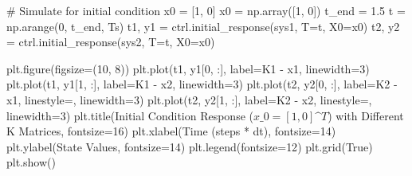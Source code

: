 \documentclass[
  letterpaper,
  DIV=11,
  numbers=noendperiod,
  oneside]{scrartcl}
\newenvironment{Shaded}{\begin{snugshade}}{\end{snugshade}}
\newcommand{\CommentTok}[1]{\textcolor[rgb]{0.37,0.37,0.37}{#1}}
\newcommand{\DecValTok}[1]{\textcolor[rgb]{0.68,0.00,0.00}{#1}}
\newcommand{\FloatTok}[1]{\textcolor[rgb]{0.68,0.00,0.00}{#1}}
\newcommand{\NormalTok}[1]{\textcolor[rgb]{0.00,0.23,0.31}{#1}}
\newcommand{\OperatorTok}[1]{\textcolor[rgb]{0.37,0.37,0.37}{#1}}
\newcommand{\StringTok}[1]{\textcolor[rgb]{0.13,0.47,0.30}{#1}}
\newcommand{\VariableTok}[1]{\textcolor[rgb]{0.07,0.07,0.07}{#1}}
\begin{document}
\begin{Shaded}
\begin{Highlighting}[numbers=left,,]
\CommentTok{\# Simulate for initial condition x0 = [1, 0]}
\NormalTok{x0 }\OperatorTok{=}\NormalTok{ np.array([}\DecValTok{1}\NormalTok{, }\DecValTok{0}\NormalTok{])}
\NormalTok{t\_end }\OperatorTok{=} \FloatTok{1.5} 
\NormalTok{t }\OperatorTok{=}\NormalTok{ np.arange(}\DecValTok{0}\NormalTok{, t\_end, Ts) }
\NormalTok{t1, y1 }\OperatorTok{=}\NormalTok{ ctrl.initial\_response(sys1, T}\OperatorTok{=}\NormalTok{t, X0}\OperatorTok{=}\NormalTok{x0)}
\NormalTok{t2, y2 }\OperatorTok{=}\NormalTok{ ctrl.initial\_response(sys2, T}\OperatorTok{=}\NormalTok{t, X0}\OperatorTok{=}\NormalTok{x0)}

\NormalTok{plt.figure(figsize}\OperatorTok{=}\NormalTok{(}\DecValTok{10}\NormalTok{, }\DecValTok{8}\NormalTok{))}
\NormalTok{plt.plot(t1, y1[}\DecValTok{0}\NormalTok{, :], label}\OperatorTok{=}\StringTok{\textquotesingle{}K1 {-} x1\textquotesingle{}}\NormalTok{, linewidth}\OperatorTok{=}\DecValTok{3}\NormalTok{)}
\NormalTok{plt.plot(t1, y1[}\DecValTok{1}\NormalTok{, :], label}\OperatorTok{=}\StringTok{\textquotesingle{}K1 {-} x2\textquotesingle{}}\NormalTok{, linewidth}\OperatorTok{=}\DecValTok{3}\NormalTok{)}
\NormalTok{plt.plot(t2, y2[}\DecValTok{0}\NormalTok{, :], label}\OperatorTok{=}\StringTok{\textquotesingle{}K2 {-} x1\textquotesingle{}}\NormalTok{, linestyle}\OperatorTok{=}\StringTok{\textquotesingle{}{-}{-}\textquotesingle{}}\NormalTok{, linewidth}\OperatorTok{=}\DecValTok{3}\NormalTok{) }
\NormalTok{plt.plot(t2, y2[}\DecValTok{1}\NormalTok{, :], label}\OperatorTok{=}\StringTok{\textquotesingle{}K2 {-} x2\textquotesingle{}}\NormalTok{, linestyle}\OperatorTok{=}\StringTok{\textquotesingle{}{-}{-}\textquotesingle{}}\NormalTok{, linewidth}\OperatorTok{=}\DecValTok{3}\NormalTok{) }
\NormalTok{plt.title(}\StringTok{\textquotesingle{}Initial Condition Response ($x\_0=[1, 0]\^{}T$) with Different K Matrices\textquotesingle{}}\NormalTok{, fontsize}\OperatorTok{=}\DecValTok{16}\NormalTok{) }
\NormalTok{plt.xlabel(}\StringTok{\textquotesingle{}Time (steps * dt)\textquotesingle{}}\NormalTok{, fontsize}\OperatorTok{=}\DecValTok{14}\NormalTok{) }
\NormalTok{plt.ylabel(}\StringTok{\textquotesingle{}State Values\textquotesingle{}}\NormalTok{, fontsize}\OperatorTok{=}\DecValTok{14}\NormalTok{) }
\NormalTok{plt.legend(fontsize}\OperatorTok{=}\DecValTok{12}\NormalTok{)}
\NormalTok{plt.grid(}\VariableTok{True}\NormalTok{) }
\NormalTok{plt.show()}
\end{Highlighting}
\end{Shaded}
\end{document}
